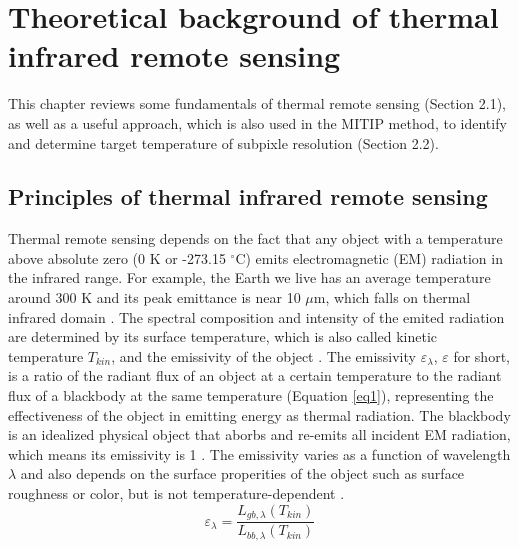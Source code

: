 \chapter{Theoretical background of thermal infrared remote sensing}

\label{Chapter2}

This chapter reviews some fundamentals of thermal remote sensing (Section 2.1), as well as a useful approach, which is also used in the MITIP method, to identify and determine target temperature of subpixle resolution (Section 2.2). \\


\section{Principles of thermal infrared remote sensing}
Thermal remote sensing depends on the fact that any object with a temperature above absolute zero (0 K or -273.15 $^\circ$C) emits electromagnetic (EM) radiation in the infrared range. For example, the Earth we live has an average temperature around 300 K and its peak emittance is near 10 $\mu$m, which falls on thermal infrared domain \parencite {Reference201, Reference202}. The spectral composition and intensity of the emited radiation are determined by its surface temperature, which is also called kinetic temperature $T_{kin}$,  and the emissivity of the object \parencite{Reference207}. The emissivity $\varepsilon_{\lambda}$, $\varepsilon$ for short, is a ratio of the radiant flux of an object at a certain temperature to the radiant flux of a blackbody at the same temperature (Equation \eqref{eq1}), representing the effectiveness of the object in emitting energy as thermal radiation. The blackbody is an idealized physical object that aborbs and re-emits all incident EM radiation, which means its emissivity is 1 \parencite{Reference206, Reference204}. The emissivity varies as a function of wavelength $\lambda$ and also depends on the surface properities of the object such as surface roughness or color, but is not temperature-dependent \parencite{Reference203}.\\
\begin{equation}
\label{eq1}
\varepsilon_{\lambda} = \frac{L_{gb, \lambda}(T_{kin})}{L_{bb, \lambda}(T_{kin})}
\end{equation}

